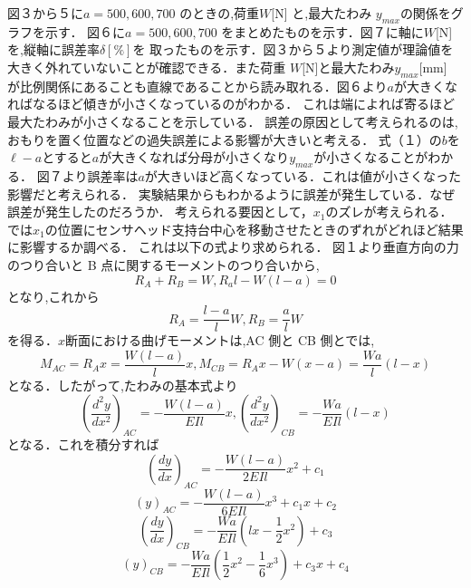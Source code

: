 \documentclass[a4paper,12pt]{jsarticle}
\begin{document}
\begin{enumerate}
\quad 図３から５に$a = 500,600,700$ のときの,荷重$ W $[N] と,最大たわみ $y_{max}$の関係をグラフを示す．
図６に$a = 500,600,700$ をまとめたものを示す．図７に軸に$ W$[N]を,縦軸に誤差率$ \delta [\%]$を
取ったものを示す．図３から５より測定値が理論値を大きく外れていないことが確認できる．また荷重 $W $[N]と最大たわみ$ y_{max}$[mm]
が比例関係にあることも直線であることから読み取れる．図６より$a$が大きくなればなるほど傾きが小さくなっているのがわかる．
これは端によれば寄るほど最大たわみが小さくなることを示している．
誤差の原因として考えられるのは,おもりを置く位置などの過失誤差による影響が大きいと考える．
式（１）の$b$を$\ell-a$とすると$a$が大きくなれば分母が小さくなり$y_{max}$が小さくなることがわかる．
図７より誤差率は$a$が大きいほど高くなっている．これは値が小さくなった影響だと考えられる．
実験結果からもわかるように誤差が発生している．なぜ誤差が発生したのだろうか．
考えられる要因として，$x_1$のズレが考えられる．
では$x_1$の位置にセンサヘッド支持台中心を移動させたときのずれがどれほど結果に影響するか調べる．
これは以下の式より求められる．
図１より垂直方向の力のつり合いと B 点に関するモーメントのつり合いから,
\begin{equation} 
  R_A+R_B=W,R_al-W(l-a)=0
\end{equation}
となり,これから
\begin{equation} 
  R_A={\dfrac{l-a}{l}W},R_B={\dfrac{a}{l}W}
\end{equation}
を得る．$x$断面における曲げモーメントは,AC 側と CB 側とでは,
\begin{equation} 
  M_{AC}=R_Ax={\dfrac{W(l-a)}{l}x},M_{CB}=R_Ax-W(x-a)={\dfrac{Wa}{l}(l-x)}
\end{equation}
となる．したがって,たわみの基本式より
\begin{equation} 
  {(\dfrac{d^2y}{dx^2})_{AC}}={-\dfrac{W(l-a)}{EIl}x},
  {(\dfrac{d^2y}{dx^2})_{CB}}={-\dfrac{Wa}{EIl}(l-x)}
\end{equation}
となる．これを積分すれば
\begin{equation} 
  {(\dfrac{dy}{dx})_{AC}}={-\dfrac{W(l-a)}{2EIl}x^2+c_1}
\end{equation}
\begin{equation} 
  {(y)_{AC}}={-\dfrac{W(l-a)}{6EIl}x^3+c_1x+c_2}
\end{equation}
\begin{equation} 
  {(\dfrac{dy}{dx})_{CB}}={-\dfrac{Wa}{EIl}(lx-\dfrac{1}{2}x^2)+c_3}
\end{equation}
\begin{equation} 
  {(y)_{CB}}={-\dfrac{Wa}{EIl}(\dfrac{1}{2}x^2-\dfrac{1}{6}x^3)+c_3x+c_4}

\end{equation}
\end{enumerate}
\end{document}
